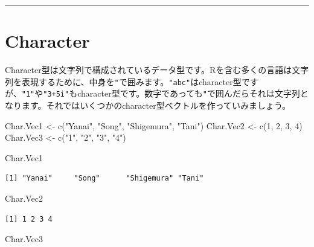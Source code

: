 \documentclass[
  a4paper,
  pandoc,
  ja=standard,
  jafont=haranoaji]{bxjsbook}
\newenvironment{Shaded}{\begin{snugshade}}{\end{snugshade}}
\newcommand{\DecValTok}[1]{\textcolor[rgb]{0.68,0.00,0.00}{#1}}
\newcommand{\FunctionTok}[1]{\textcolor[rgb]{0.28,0.35,0.67}{#1}}
\newcommand{\NormalTok}[1]{\textcolor[rgb]{0.00,0.48,0.65}{#1}}
\newcommand{\OtherTok}[1]{\textcolor[rgb]{0.00,0.48,0.65}{#1}}
\newcommand{\StringTok}[1]{\textcolor[rgb]{0.13,0.47,0.30}{#1}}
\begin{document}
\begin{center}\rule{0.5\linewidth}{0.5pt}\end{center}

\hypertarget{sec-type_character}{%
\section{Character}\label{sec-type_character}}

Character型は文字列で構成されているデータ型です。Rを含む多くの言語は文字列を表現するために、中身を\texttt{"}で囲みます。\texttt{"abc"}はcharacter型ですが、\texttt{"1"}や\texttt{"3+5i"}もcharacter型です。数字であっても\texttt{"}で囲んだらそれは文字列となります。それではいくつかのcharacter型ベクトルを作っていみましょう。

\begin{Shaded}
\begin{Highlighting}[numbers=left,,]
\NormalTok{Char.Vec1 }\OtherTok{\textless{}{-}} \FunctionTok{c}\NormalTok{(}\StringTok{"Yanai"}\NormalTok{, }\StringTok{"Song"}\NormalTok{, }\StringTok{"Shigemura"}\NormalTok{, }\StringTok{"Tani"}\NormalTok{)}
\NormalTok{Char.Vec2 }\OtherTok{\textless{}{-}} \FunctionTok{c}\NormalTok{(}\DecValTok{1}\NormalTok{, }\DecValTok{2}\NormalTok{, }\DecValTok{3}\NormalTok{, }\DecValTok{4}\NormalTok{)}
\NormalTok{Char.Vec3 }\OtherTok{\textless{}{-}} \FunctionTok{c}\NormalTok{(}\StringTok{"1"}\NormalTok{, }\StringTok{"2"}\NormalTok{, }\StringTok{"3"}\NormalTok{, }\StringTok{"4"}\NormalTok{)}

\NormalTok{Char.Vec1}
\end{Highlighting}
\end{Shaded}

\begin{verbatim}
[1] "Yanai"     "Song"      "Shigemura" "Tani"     
\end{verbatim}

\begin{Shaded}
\begin{Highlighting}[numbers=left,,]
\NormalTok{Char.Vec2}
\end{Highlighting}
\end{Shaded}

\begin{verbatim}
[1] 1 2 3 4
\end{verbatim}

\begin{Shaded}
\begin{Highlighting}[numbers=left,,]
\NormalTok{Char.Vec3}
\end{Highlighting}
\end{Shaded}
\end{document}
